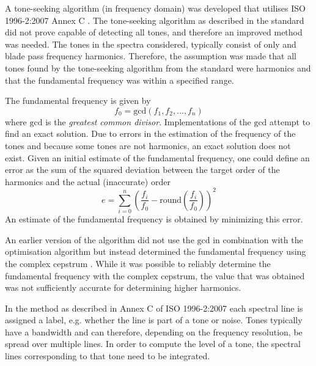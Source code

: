 A tone-seeking algorithm (in frequency domain) was developed \cite{Rietdijk2016}
that utilises ISO 1996-2:2007 Annex C \cite{ISO1996-2_2007}. The tone-seeking
algorithm as described in the standard did not prove capable of detecting all
tones, and therefore an improved method was needed. The tones in the spectra
considered, typically consist of only  and blade pass frequency
harmonics. Therefore, the assumption was made that all tones found by the
tone-seeking algorithm from the standard were harmonics and that the fundamental
frequency was within a specified range.

The fundamental frequency is given by
\begin{equation}
 f_{0} = \mathrm{gcd}\left(f_1, f_2, \dots, f_n \right)
\end{equation}
where $\mathrm{gcd}$ is the \emph{greatest common divisor}.
Implementations of the $\mathrm{gcd}$ attempt to find an exact solution.
Due to errors in the estimation of the frequency of the tones and because some tones are
not harmonics, an exact solution does not exist. Given an initial estimate of
the fundamental frequency, one could define an error as the sum of the squared
deviation between the target order of the harmonics and the actual (inaccurate)
order
\begin{equation}
 e = \sum_{i=0}^{n} \left( \frac{f_i}{f_0} - \mathrm{round}\left(\frac{f_i}{f_0}\right) \right)^2
\end{equation}
An estimate of the fundamental frequency is obtained by minimizing this error.

An earlier version of the algorithm did not use the $\mathrm{gcd}$ in
combination with the optimisation algorithm but instead determined the
fundamental frequency using the complex cepstrum \cite{Rietdijk2015}.
While it was possible to reliably determine the fundamental frequency with the
complex cepstrum, the value that was obtained was not sufficiently accurate
for determining higher harmonics.

In the method as described in Annex C of ISO 1996-2:2007 each spectral line is
assigned a label, e.g. whether the line is part of a tone or noise. Tones typically
have a bandwidth and can therefore, depending on the frequency resolution, be spread over multiple lines.
In order to compute the level of a tone, the spectral lines corresponding to that tone need to be integrated.

